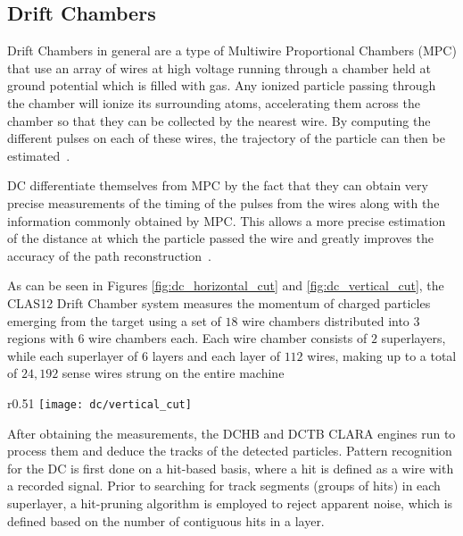 \subsection{Drift Chambers} \label{ssec:framework_dc}
Drift Chambers in general are a type of Multiwire Proportional Chambers (MPC) that use an array of wires at high voltage running through a chamber held at ground potential which is filled with gas.
Any ionized particle passing through the chamber will ionize its surrounding atoms, accelerating them across the chamber so that they can be collected by the nearest wire.
By computing the different pulses on each of these wires, the trajectory of the particle can then be estimated~\cite{sauli1977principles}.

DC differentiate themselves from MPC by the fact that they can obtain very precise measurements of the timing of the pulses from the wires along with the information commonly obtained by MPC.
This allows a more precise estimation of the distance at which the particle passed the wire and greatly improves the accuracy of the path reconstruction~\cite{blum2008particle}.

As can be seen in Figures \ref{fig:dc_horizontal_cut} and \ref{fig:dc_vertical_cut}, the CLAS12 Drift Chamber system measures the momentum of charged particles emerging from the target using a set of $18$ wire chambers distributed into $3$ regions with $6$ wire chambers each.
Each wire chamber consists of $2$ superlayers, while each superlayer of $6$ layers and each layer of $112$ wires, making up to a total of $24,192$ sense wires strung on the entire machine~\cite{mestayer2000clas}
    
    \begin{wrapfigure}{r}{0.51\textwidth}
        \centering
        \texttt{[image: dc/vertical\_cut]}
        \caption{\label{fig:dc_vertical_cut} Vertical cut through the drift chambers transverse to the beam line at the target location. Source: The CLAS Drift Chamber System~\cite{mestayer2000clas}.}
    \end{wrapfigure}

After obtaining the measurements, the DCHB and DCTB CLARA engines run to process them and deduce the tracks of the detected particles.
Pattern recognition for the DC is first done on a hit-based basis, where a hit is defined as a wire with a recorded signal.
Prior to searching for track segments (groups of hits) in each superlayer, a hit-pruning algorithm is employed to reject apparent noise, which is defined based on the number of contiguous hits in a layer.

